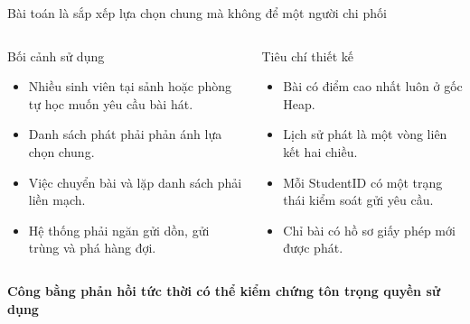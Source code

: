 \documentclass[aspectratio=169,11pt]{beamer}
\newcommand{\metricline}[1]{%
  {\sffamily\small\bfseries\color{hbgreen}#1}}
\begin{document}
\begin{frame}{Bài toán là sắp xếp lựa chọn chung mà không để một người chi phối}
\begin{columns}[T,totalwidth=\textwidth]
\begin{block}{Bối cảnh sử dụng}
\begin{itemize}
  \item Nhiều sinh viên tại sảnh hoặc phòng tự học muốn yêu cầu bài hát.
  \item Danh sách phát phải phản ánh lựa chọn chung.
  \item Việc chuyển bài và lặp danh sách phải liền mạch.
  \item Hệ thống phải ngăn gửi dồn, gửi trùng và phá hàng đợi.
\end{itemize}
\end{block}
\begin{block}{Tiêu chí thiết kế}
\begin{itemize}
  \item Bài có điểm cao nhất luôn ở gốc Heap.
  \item Lịch sử phát là một vòng liên kết hai chiều.
  \item Mỗi StudentID có một trạng thái kiểm soát gửi yêu cầu.
  \item Chỉ bài có hồ sơ giấy phép mới được phát.
\end{itemize}
\end{block}
\end{columns}
\vspace{0.35cm}
\begin{center}
\metricline{Công bằng \quad\textbullet\quad phản hồi tức thời \quad\textbullet\quad có thể kiểm chứng
\quad\textbullet\quad tôn trọng quyền sử dụng}
\end{center}
\end{frame}
\end{document}
